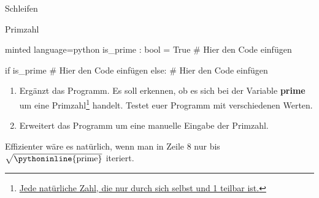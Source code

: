 \begin{task}[points=auto]{Schleifen}
\begin{subtask*}[points=0]{Primzahl }
\begin{codeBlock}[]{minted language=python}
                is_prime : bool = True
                # Hier den Code einfügen

                if is_prime
                    # Hier den Code einfügen
                else:
                    # Hier den Code einfügen
        \end{codeBlock}
        \begin{enumerate}
            \item Ergänzt das Programm. Es soll erkennen, ob es sich bei der Variable \textbf{prime} um eine Primzahl\footnote{\href{https://de.wikipedia.org/wiki/Primzahl}{Jede natürliche Zahl, die nur durch sich selbst und 1 teilbar ist.}} handelt. Testet euer Programm mit verschiedenen Werten.
            \item Erweitert das Programm um eine manuelle Eingabe der Primzahl.
        \end{enumerate}

        \begin{solution}
            \begin{anmerkung}
                Effizienter wäre es natürlich, wenn man in Zeile 8 nur bis $\sqrt{\text{\pythoninline{prime}}}$ iteriert.
            \end{anmerkung}
        \end{solution}
    \end{subtask*}
\end{task}
